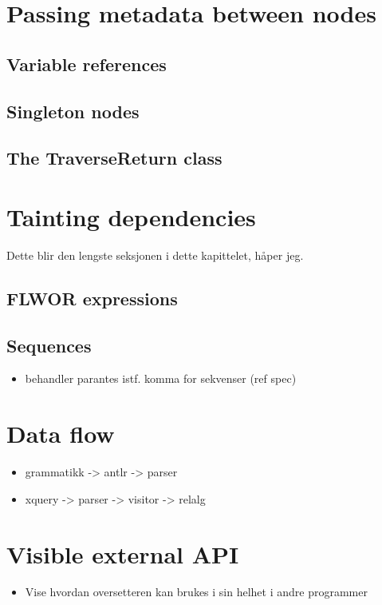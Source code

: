\section{Passing metadata between nodes}
\subsection{Variable references}
\subsection{Singleton nodes}
\subsection{The TraverseReturn class}

\section{Tainting dependencies}
Dette blir den lengste seksjonen i dette kapittelet, h\aa per jeg.
\subsection{FLWOR expressions}
\subsection{Sequences}
\begin{itemize}
  \item behandler parantes istf. komma for sekvenser (ref spec) 
\end{itemize}

\section{Data flow}
\begin{itemize}
  \item grammatikk -> antlr -> parser
  \item xquery -> parser -> visitor -> relalg
\end{itemize}

\section{Visible external API}
\begin{itemize}
  \item Vise hvordan oversetteren kan brukes i sin helhet i andre programmer
\end{itemize}

